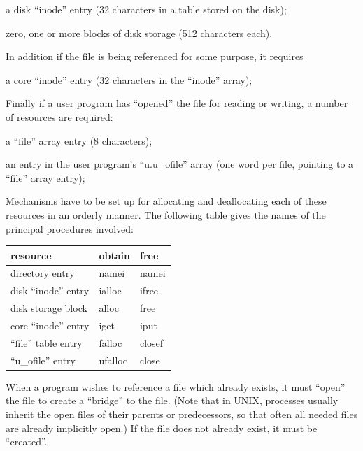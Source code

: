 \item[(b)] a disk ``inode'' entry (32 characters in a table stored on the
disk);

\item[(c)] zero, one or more blocks of disk
 storage (512 characters each).
\ed


\noindent In addition if the file is being referenced for some purpose, it requires

\bd
\item[(d)] a core ``inode'' entry (32 characters in the ``inode'' array);
\ed


\noindent Finally if a user program has ``opened''
the file for reading or writing, a
number of resources are required:

\bd
\item[(e)] a ``file'' array entry (8 characters);

\item[(f)] an entry in the user program's
``u.u\_ofile'' array (one word per
file, pointing to a ``file'' array
entry);
\ed


Mechanisms have to be set up for allocating and deallocating each of these
resources in an orderly manner. The
following table gives the names of the
principal procedures involved:

\begin{center}
\begin{tabular}{lll}
{\bf resource} & {\bf obtain} & {\bf free} \\ \hline
directory entry & namei & namei\\
disk ``inode'' entry & ialloc & ifree\\
disk storage block & alloc & free\\
core ``inode'' entry & iget & iput\\
``file'' table entry & falloc & closef\\
``u\_ofile'' entry & ufalloc & close\\
\end{tabular}
\end{center}


When a program wishes to reference a
file which already exists, it must
``open'' the file to create a ``bridge'' to
the file. (Note that in UNIX,
processes usually inherit the open
files of their parents or predecessors,
so that often all needed files are
already implicitly open.) If the file
does not already exist, it must be
``created''.



